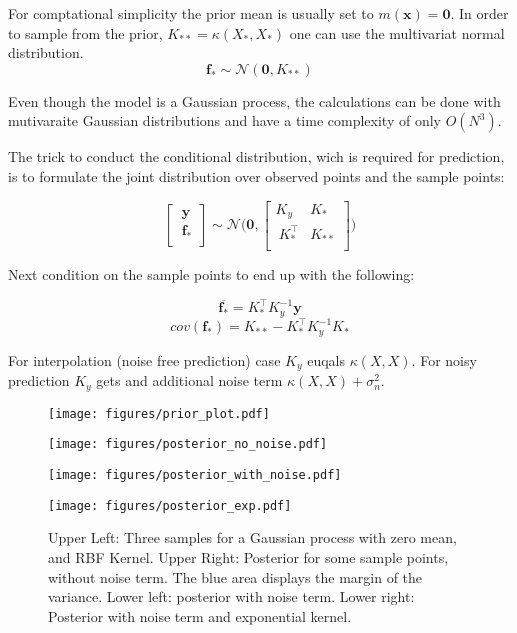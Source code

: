 \documentclass[english]{article}
\begin{document}
For comptational simplicity the prior mean is usually set to $m(\mathbf{x}) = \mathbf{0}$. In order to sample from the prior, $K_{**} = \kappa(X_*,X_*)$ one can use the multivariat normal distribution.
$$\mathbf{f_*} \sim \mathcal{N}(\mathbf{0}, K_{**})$$

Even though the model is a Gaussian process, the calculations can be done with mutivaraite Gaussian distributions and have a time complexity of only $O(N^3)$.

The trick to conduct the conditional distribution, wich is required for prediction, is to formulate the joint distribution over observed points and the sample points:

$$
\begin{bmatrix}
\ \mathbf{y}\ \\
\ \mathbf{f_*} \\
\end{bmatrix}
\sim \mathcal{N} \Bigg(\mathbf{0},
\begin{bmatrix}
K_y & K_* \\
\ K^{\top}_{*} & K_{**}  \\
\end{bmatrix}
\Bigg)
$$

Next condition on the sample points to end up with the following:

$$\overline{\mathbf{f_*}} = K_*^\top K_y^{-1}\mathbf{y}$$
$$cov(\mathbf{f_*}) = K_{**} - K_*^\top K_y^{-1} K_*$$

For interpolation (noise free prediction) case $K_y$ euqals $\kappa(X,X)$. For noisy prediction $K_y$ gets and additional noise term $\kappa(X,X) + \sigma_n^2$.

\begin{figure}

  \begin{minipage}{0.5\textwidth}
  \texttt{[image: figures/prior\_plot.pdf]}
  \end{minipage}%
  \begin{minipage}{0.5\textwidth}
  \texttt{[image: figures/posterior\_no\_noise.pdf]}
  \end{minipage}%

  \begin{minipage}{0.5\textwidth}
  \texttt{[image: figures/posterior\_with\_noise.pdf]}
  \end{minipage}%
  \begin{minipage}{0.5\textwidth}
  \texttt{[image: figures/posterior\_exp.pdf]}
  \end{minipage}%

  \caption{Upper Left: Three samples for a Gaussian process with zero mean, and RBF Kernel. Upper Right: Posterior for some sample points, without noise term. The blue area displays the margin of the variance. Lower left: posterior with noise term. Lower right: Posterior with noise term and exponential kernel.}

\end{figure}
\end{document}
